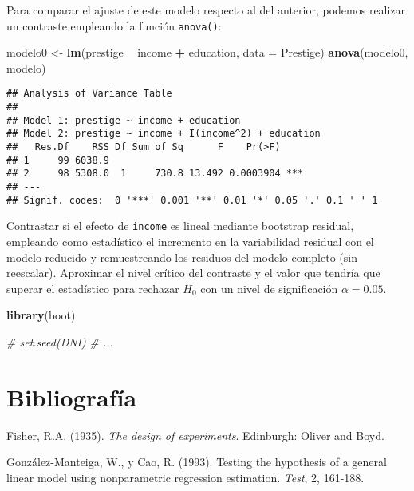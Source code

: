 \documentclass[
]{book}
\newenvironment{Shaded}{\begin{snugshade}}{\end{snugshade}}
\newcommand{\CommentTok}[1]{\textcolor[rgb]{0.56,0.35,0.01}{\textit{#1}}}
\newcommand{\DataTypeTok}[1]{\textcolor[rgb]{0.13,0.29,0.53}{#1}}
\newcommand{\KeywordTok}[1]{\textcolor[rgb]{0.13,0.29,0.53}{\textbf{#1}}}
\newcommand{\NormalTok}[1]{#1}
\newcommand{\OperatorTok}[1]{\textcolor[rgb]{0.81,0.36,0.00}{\textbf{#1}}}
\newcommand{\StringTok}[1]{\textcolor[rgb]{0.31,0.60,0.02}{#1}}
\theoremstyle{definition}
\theoremstyle{definition}
\theoremstyle{definition}
\theoremstyle{remark}
\begin{document}
Para comparar el ajuste de este modelo respecto al del anterior, podemos
realizar un contraste empleando la función \texttt{anova()}:

\begin{Shaded}
\begin{Highlighting}[]
\NormalTok{modelo0 <-}\StringTok{ }\KeywordTok{lm}\NormalTok{(prestige }\OperatorTok{~}\StringTok{ }\NormalTok{income }\OperatorTok{+}\StringTok{ }\NormalTok{education, }\DataTypeTok{data =}\NormalTok{ Prestige)}
\KeywordTok{anova}\NormalTok{(modelo0, modelo)}
\end{Highlighting}
\end{Shaded}

\begin{verbatim}
## Analysis of Variance Table
## 
## Model 1: prestige ~ income + education
## Model 2: prestige ~ income + I(income^2) + education
##   Res.Df    RSS Df Sum of Sq      F    Pr(>F)    
## 1     99 6038.9                                  
## 2     98 5308.0  1     730.8 13.492 0.0003904 ***
## ---
## Signif. codes:  0 '***' 0.001 '**' 0.01 '*' 0.05 '.' 0.1 ' ' 1
\end{verbatim}

Contrastar si el efecto de \texttt{income} es lineal mediante bootstrap residual,
empleando como estadístico el incremento en la variabilidad residual con el
modelo reducido y remuestreando los residuos del modelo completo (sin reescalar).
Aproximar el nivel crítico del contraste y el valor que tendría que superar el
estadístico para rechazar \(H_0\) con un nivel de significación \(\alpha = 0.05\).

\begin{Shaded}
\begin{Highlighting}[]
\KeywordTok{library}\NormalTok{(boot)}

\CommentTok{# set.seed(DNI)}
\CommentTok{# ...}
\end{Highlighting}
\end{Shaded}

\hypertarget{bibliografuxeda}{%
\section{Bibliografía}\label{bibliografuxeda}}

Fisher, R.A. (1935). \emph{The design of experiments}. Edinburgh: Oliver and Boyd.

González-Manteiga, W., y Cao, R. (1993). Testing the hypothesis of a general linear model
using nonparametric regression estimation. \emph{Test}, 2, 161-188.
\end{document}
